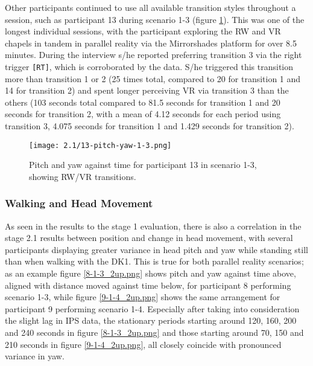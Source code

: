 Other participants continued to use all available transition styles throughout a session, such as participant 13 during scenario 1-3 (figure \ref{13-pitch-yaw-1-3.png}). This was one of the longest individual sessions, with the participant exploring the RW and VR chapels in tandem in parallel reality via the Mirrorshades platform for over 8.5 minutes. During the interview s/he reported preferring transition 3 via the right trigger \texttt{[RT]}, which is corroborated by the data. S/he triggered this transition more than transition 1 or 2 (25 times total, compared to 20 for transition 1 and 14 for transition 2) and spent longer perceiving VR via transition 3 than the others (103 seconds total compared to 81.5 seconds for transition 1 and 20 seconds for transition 2, with a mean of 4.12 seconds for each period using transition 3, 4.075 seconds for transition 1 and 1.429 seconds for transition 2).

\begin{figure}
	\begin{center}
	\texttt{[image: 2.1/13-pitch-yaw-1-3.png]}
	\caption{Pitch and yaw against time for participant 13 in scenario 1-3, showing RW/VR transitions.}
	\label{13-pitch-yaw-1-3.png}
	\end{center}
\end{figure}


\subsubsection{Walking and Head Movement}

As seen in the results to the stage 1 evaluation, there is also a correlation in the stage 2.1 results between position and change in head movement, with several participants displaying greater variance in head pitch and yaw while standing still than when walking with the DK1. This is true for both parallel reality scenarios; as an example figure \ref{8-1-3_2up.png} shows pitch and yaw against time above, aligned with distance moved against time below, for participant 8 performing scenario 1-3, while figure \ref{9-1-4_2up.png} shows the same arrangement for participant 9 performing scenario 1-4. Especially after taking into consideration the slight lag in IPS data, the stationary periods starting around 120, 160, 200 and 240 seconds in figure \ref{8-1-3_2up.png} and those starting around 70, 150 and 210 seconds in figure \ref{9-1-4_2up.png}, all closely coincide with pronounced variance in yaw.

